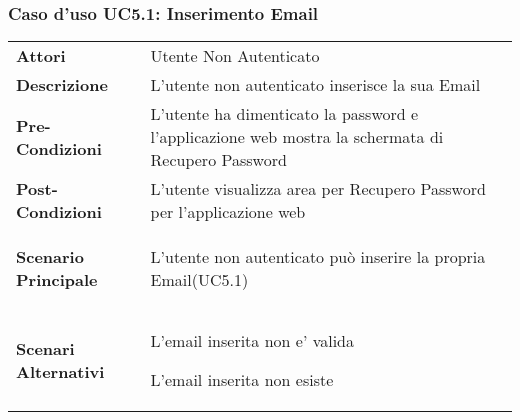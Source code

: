 \subsubsection{Caso d'uso UC5.1:  Inserimento Email}
\label{UC5_1}

\begin{longtable}{ l | p{11cm}}
	\hline
	\rowcolor{Gray}
	 \multicolumn{2}{c}{UC5.1 - Inserimento Email} \\
	 \hline
	\textbf{Attori} & Utente Non Autenticato \\
	\textbf{Descrizione} & L'utente non autenticato inserisce la sua Email  \\
	\textbf{Pre-Condizioni} & L'utente ha dimenticato la password e l'applicazione web mostra la schermata di Recupero Password\\
	\textbf{Post-Condizioni} & L'utente visualizza area per Recupero Password per l'applicazione web \\
	\textbf{Scenario Principale} & \begin{enumerate*}[label=(\arabic*.),itemjoin={\newline}]
		\item L'utente non autenticato può inserire la propria Email(UC5.1)
	\end{enumerate*}\\
	\textbf{Scenari Alternativi} & 
	\begin{enumerate*}[label=(\arabic*.),itemjoin={\newline}]
		\item L'email inserita non e' valida
		\item L'email inserita non esiste
	\end{enumerate*}\\
\end{longtable}